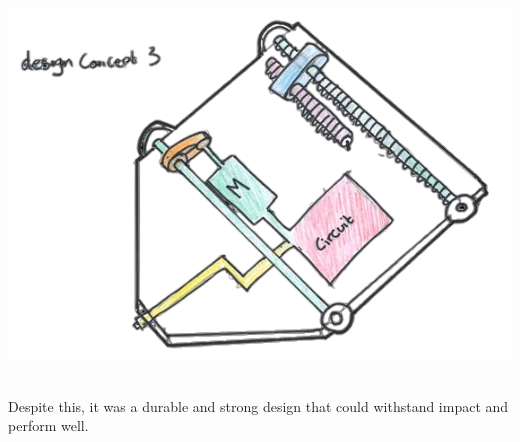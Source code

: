 \documentclass{article}
\begin{document}
\begin{minipage}{0.4\textwidth}
	\centering
	\includegraphics[width=1\textwidth]{images/image_8_2-Photoroom.png}
\end{minipage}\\[8pt]
Despite this, it was a durable and strong design that could withstand impact and perform well.

\newpage\restoregeometry
\end{document}
